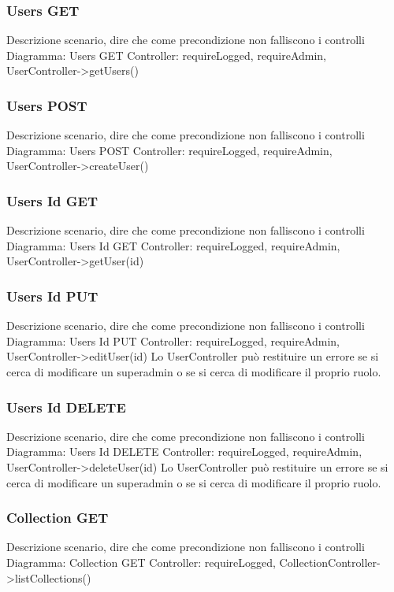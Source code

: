 \subsubsection{Users GET}
Descrizione scenario, dire che come precondizione non falliscono i controlli
Diagramma: Users GET
Controller: requireLogged, requireAdmin, UserController->getUsers()

\subsubsection{Users POST}
Descrizione scenario, dire che come precondizione non falliscono i controlli
Diagramma: Users POST
Controller: requireLogged, requireAdmin, UserController->createUser()

\subsubsection{Users Id GET}
Descrizione scenario, dire che come precondizione non falliscono i controlli
Diagramma: Users Id GET
Controller: requireLogged, requireAdmin, UserController->getUser(id)

\subsubsection{Users Id PUT}
Descrizione scenario, dire che come precondizione non falliscono i controlli
Diagramma: Users Id PUT
Controller: requireLogged, requireAdmin, UserController->editUser(id)
Lo UserController può restituire un errore se si cerca di modificare un superadmin o se si cerca di modificare il proprio ruolo.

\subsubsection{Users Id DELETE}
Descrizione scenario, dire che come precondizione non falliscono i controlli
Diagramma: Users Id DELETE
Controller: requireLogged, requireAdmin, UserController->deleteUser(id)
Lo UserController può restituire un errore se si cerca di modificare un superadmin o se si cerca di modificare il proprio ruolo.

\subsubsection{Collection GET}
Descrizione scenario, dire che come precondizione non falliscono i controlli
Diagramma: Collection GET
Controller: requireLogged, CollectionController->listCollections()

